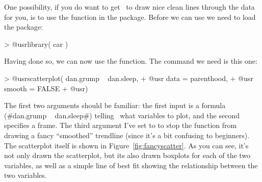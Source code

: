 One possibility, if you do want to get \R\ to draw nice clean lines through the data for you, is to use the  function in the  package. Before we can use  we need to load the package:
\begin{rblock1}
> @usr{library( car )}
\end{rblock1}
Having done so, we can now use the function. The command we need is this one:
\begin{rblock1}
> @usr{scatterplot( dan.grump ~ dan.sleep,}
+ @usr{             data = parenthood, }
+ @usr{             smooth = FALSE}
+ @usr{)}
\end{rblock1}
The first two arguments should be familiar: the first input is a formula (\rtextverb#dan.grump ~ dan.sleep#) telling \R\ what variables to plot, and the second specifies a  frame. The third argument  I've set to  to stop the  function from drawing a fancy ``smoothed'' trendline (since it's a bit confusing to beginners). The scatterplot itself is shown in Figure~\ref{fig:fancyscatter}. As you can see, it's not only drawn the scatterplot, but its also drawn boxplots for each of the two variables, as well as a simple line of best fit showing the relationship between the two variables. 

 




